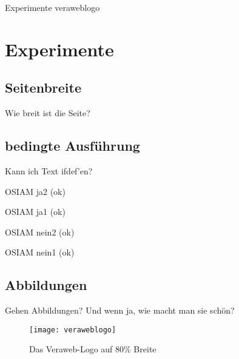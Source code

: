 \documentclass{tarentanleitung}
\begin{document}

\tarentanleitung
 {Experimente}
 {\vwiaverspo}{\vwiaversfassungnr}{\vwiaversfassungmonat}{\vwiaversfassungjahr}{veraweblogo}



\section{Experimente}

\subsection{Seitenbreite}

Wie breit ist die Seite? %

\the\textwidth

\subsection{bedingte Ausführung}

Kann ich Text ifdef'en?

\newif\ifosiam
\osiamtrue

\ifosiam
 OSIAM ja2 (ok)
\else
 OSIAM nein2
\fi

\ifosiam
 OSIAM ja1 (ok)
\fi

\ifosiam\else
 OSIAM nein1
\fi

\osiamfalse

\ifosiam
 OSIAM ja2
\else
 OSIAM nein2 (ok)
\fi

\ifosiam
 OSIAM ja1
\fi

\ifosiam\else
 OSIAM nein1 (ok)
\fi

\subsection{Abbildungen}

Gehen Abbildungen? Und wenn ja, wie macht man sie schön?

\begin{figure}[h!]
 \centering\texttt{[image: veraweblogo]}
 \caption{Das Veraweb-Logo auf 80\% Breite}
 \label{fig:logovw}
\end{figure}
\end{document}
